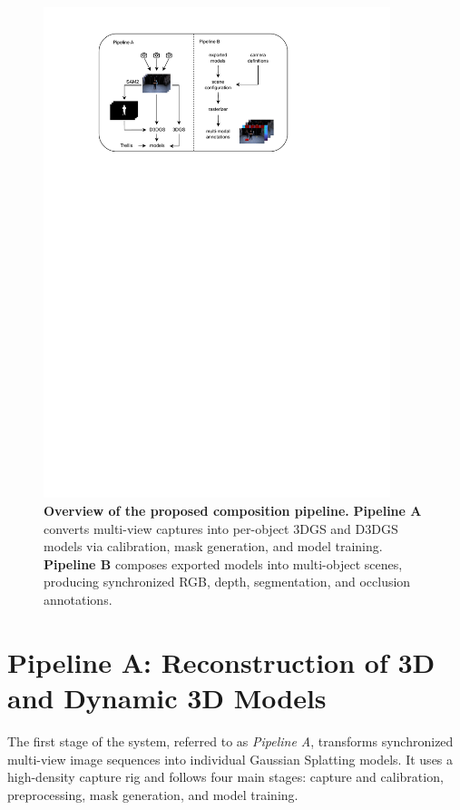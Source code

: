 \begin{figure}[!t]
    \centering
    \includegraphics[width=0.9\textwidth]{Grafiken/Ablauf.pdf}
    \caption{
       \textbf{Overview of the proposed composition pipeline.}
        \textbf{Pipeline A} converts multi-view captures into per-object 3DGS and D3DGS models via calibration, mask generation, and model training.
        \textbf{Pipeline B} composes exported models into multi-object scenes, producing synchronized RGB, depth, segmentation, and occlusion annotations.
    }
    \label{fig:Ablauf}
\end{figure}


\section{Pipeline A: Reconstruction of 3D and Dynamic 3D Models}

The first stage of the system, referred to as \emph{Pipeline A}, transforms synchronized multi-view image sequences into individual Gaussian Splatting models. It uses a high-density capture rig and follows four main stages: capture and calibration, preprocessing, mask generation, and model training.

